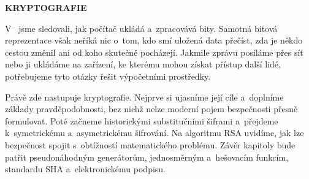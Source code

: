 \documentclass[11pt,a4paper,oneside]{article}
\begin{document}
\begin{center}
    {\huge \textbf{\MakeUppercase{Kryptografie}}}\\[1.2cm]
\end{center}

V~ jsme sledovali, jak počítač ukládá a~zpracovává bity. Samotná bitová reprezentace však neříká nic o~tom, kdo smí uložená data přečíst, zda je někdo cestou změnil ani od koho skutečně pocházejí. Jakmile zprávu posíláme přes síť nebo ji ukládáme na zařízení, ke kterému mohou získat přístup další lidé, potřebujeme tyto otázky řešit výpočetními prostředky.

Právě zde nastupuje kryptografie. Nejprve si ujasníme její cíle a~doplníme základy pravděpodobnosti, bez nichž nelze moderní pojem bezpečnosti přesně formulovat. Poté začneme historickými substitučními šiframi a~přejdeme k~symetrickému a~asymetrickému šifrování. Na algoritmu RSA uvidíme, jak lze bezpečnost spojit s~obtížností matematického problému. Závěr kapitoly bude patřit pseudonáhodným generátorům, jednosměrným a~hešovacím funkcím, standardu SHA a~elektronickému podpisu.











\end{document}
